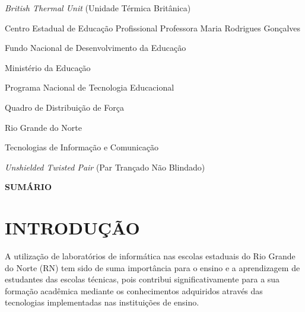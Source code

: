 \documentclass[12pt, openright, oneside, a4paper, brazil]{abntex2}
\begin{document}
\newpage
{}
\listoffigures*
\cleardoublepage
\newpage
{}
\begin{siglas}
  \item[BTU] \textit{British Thermal Unit} (Unidade Térmica Britânica)
  \item[CEEP-PMRG] Centro Estadual de Educação Profissional Professora Maria Rodrigues Gonçalves
  \item[FNDE] Fundo Nacional de Desenvolvimento da Educação
  \item[MEC] Ministério da Educação
  \item[ProInfo] Programa Nacional de Tecnologia Educacional
  \item[QDF] Quadro de Distribuição de Força
  \item[RN] Rio Grande do Norte
  \item[TICs] Tecnologias de Informação e Comunicação
  \item[UTP] \textit{Unshielded Twisted Pair} (Par Trançado Não Blindado)
\end{siglas}
\cleardoublepage
\newpage
\thispagestyle{empty}
\begin{center}
  {\bfseries\large SUMÁRIO}
\end{center}
\vspace{0.6cm}

\begingroup
  \makeatletter
  \renewcommand{\printtoctitle}[1]{}
  \makeatother
  
  \tableofcontents*
\endgroup

\cleardoublepage

\newpage
\pagestyle{simple}
\textual

\chapter{INTRODUÇÃO}
	A utilização de laboratórios de informática nas escolas estaduais do Rio Grande do Norte (RN) tem sido de suma importância para o ensino e a aprendizagem de estudantes das escolas técnicas, pois contribui significativamente para a sua formação acadêmica mediante os conhecimentos adquiridos através das tecnologias implementadas nas instituições de ensino.
\end{document}
